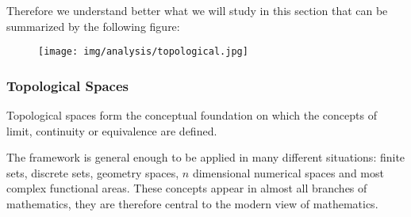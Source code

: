 	Therefore we understand better what we will study in this section that can be summarized by the following figure:
	\begin{figure}[H]
		\centering
		\texttt{[image: img/analysis/topological.jpg]}
	\end{figure}

	\subsubsection{Topological Spaces}
	Topological spaces form the conceptual foundation on which the concepts of limit, continuity or equivalence are defined.
	
	The framework is general enough to be applied in many different situations: finite sets, discrete sets, geometry spaces, $n$ dimensional numerical spaces and most complex functional areas. These concepts appear in almost all branches of mathematics, they are therefore central to the modern view of mathematics.
	
